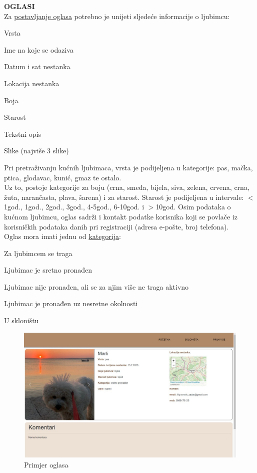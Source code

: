 		
		\textbf{OGLASI}\\
		Za \underline{postavljanje oglasa} potrebno je unijeti sljedeće informacije o ljubimcu:
		\begin{packed_item}
			\item Vrsta
			\item Ime na koje se odaziva
			\item Datum i sat nestanka
			\item Lokacija nestanka
			\item Boja
			\item Starost
			\item Tekstni opis
			\item Slike (najviše 3 slike)
		\end{packed_item}
		Pri pretraživanju kućnih ljubimaca, vrsta je podijeljena u kategorije: pas, mačka, ptica, glodavac, kunić, gmaz te ostalo.\\
		Uz to, postoje kategorije za boju (crna, smeđa, bijela, siva, zelena, crvena, crna, žuta, narančasta, plava, šarena) i za starost. Starost je podijeljena u intervale: $<$1god., 1god., 2god., 3god., 4-5god., 6-10god. i $>$10god.
		Osim podataka o kućnom ljubimcu, oglas sadrži i kontakt podatke korisnika koji se povlače iz korisničkih podataka danih pri registraciji (adresa e-pošte, broj telefona).\\
		Oglas mora imati jednu od \underline{kategorija}:
		\begin{packed_item}
			\item Za ljubimcem se traga
			\item Ljubimac je sretno pronađen
			\item Ljubimac nije pronađen, ali se za njim više ne traga aktivno
			\item Ljubimac je pronađen uz nesretne okolnosti
			\item U skloništu 
		\end{packed_item}
		\begin{figure}[H]
			
			\includegraphics[scale =0.4]{oglas.JPEG}
			\centering
			\caption{Primjer oglasa}
			\label{fig:your_label}
		\end{figure}
		
